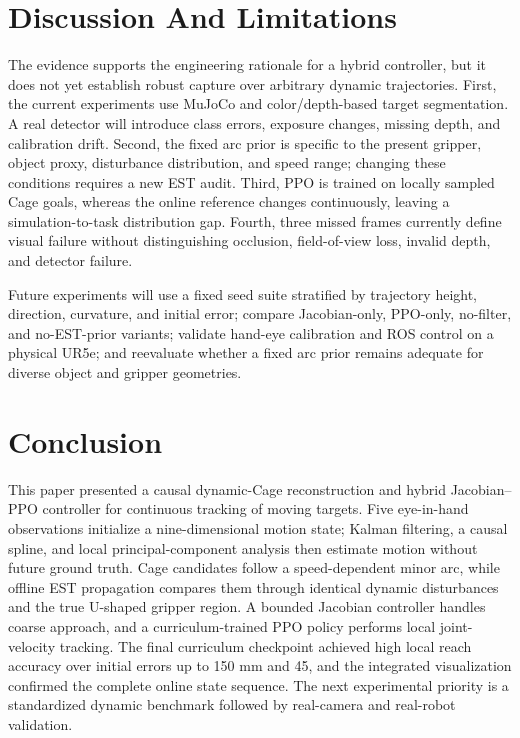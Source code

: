 \documentclass[conference]{IEEEtran}
\begin{document}
\section{Discussion And Limitations}

The evidence supports the engineering rationale for a hybrid controller, but it does not yet establish robust capture over arbitrary dynamic trajectories. First, the current experiments use MuJoCo and color/depth-based target segmentation. A real detector will introduce class errors, exposure changes, missing depth, and calibration drift. Second, the fixed arc prior is specific to the present gripper, object proxy, disturbance distribution, and speed range; changing these conditions requires a new EST audit. Third, PPO is trained on locally sampled Cage goals, whereas the online reference changes continuously, leaving a simulation-to-task distribution gap. Fourth, three missed frames currently define visual failure without distinguishing occlusion, field-of-view loss, invalid depth, and detector failure.

Future experiments will use a fixed seed suite stratified by trajectory height, direction, curvature, and initial error; compare Jacobian-only, PPO-only, no-filter, and no-EST-prior variants; validate hand-eye calibration and ROS control on a physical UR5e; and reevaluate whether a fixed arc prior remains adequate for diverse object and gripper geometries.

\section{Conclusion}

This paper presented a causal dynamic-Cage reconstruction and hybrid Jacobian--PPO controller for continuous tracking of moving targets. Five eye-in-hand observations initialize a nine-dimensional motion state; Kalman filtering, a causal spline, and local principal-component analysis then estimate motion without future ground truth. Cage candidates follow a speed-dependent minor arc, while offline EST propagation compares them through identical dynamic disturbances and the true U-shaped gripper region. A bounded Jacobian controller handles coarse approach, and a curriculum-trained PPO policy performs local joint-velocity tracking. The final curriculum checkpoint achieved high local reach accuracy over initial errors up to 150 mm and 45\textdegree{}, and the integrated visualization confirmed the complete online state sequence. The next experimental priority is a standardized dynamic benchmark followed by real-camera and real-robot validation.
\end{document}
